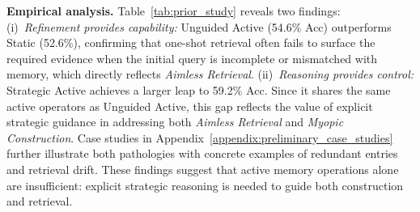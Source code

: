 
\noindent\textbf{Empirical analysis.} Table~\ref{tab:prior_study} reveals two findings: (i)~\emph{Refinement provides capability:} {Unguided Active} (54.6\% Acc) outperforms {Static} (52.6\%), confirming that one-shot retrieval often fails to surface the required evidence when the initial query is incomplete or mismatched with memory, which directly reflects \emph{Aimless Retrieval}. (ii)~\emph{Reasoning provides control:} {Strategic Active} achieves a larger leap to 59.2\% Acc. Since it shares the same active operators as {Unguided Active}, this gap reflects the value of explicit strategic guidance in addressing both \emph{Aimless Retrieval} and \emph{Myopic Construction}. Case studies in Appendix~\ref{appendix:preliminary_case_studies} further illustrate both pathologies with concrete examples of redundant entries and retrieval drift. 
These findings suggest that active memory operations alone are insufficient: explicit strategic reasoning is needed to guide both construction and retrieval. 




